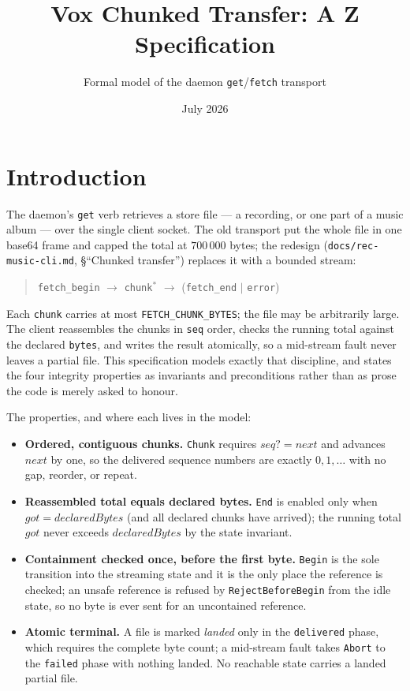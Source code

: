 \documentclass[a4paper,10pt,fleqn]{article}
\begin{document}
\title{Vox Chunked Transfer: A Z Specification}
\author{Formal model of the daemon \texttt{get}/\texttt{fetch} transport}
\date{July 2026}
\maketitle

\section{Introduction}

The daemon's \texttt{get} verb retrieves a store file --- a recording, or one
part of a music album --- over the single client socket. The old transport put
the whole file in one base64 frame and capped the total at
$700\,000$ bytes; the redesign (\texttt{docs/rec-music-cli.md},
\S``Chunked transfer'') replaces it with a bounded stream:

\begin{quote}
\texttt{fetch\_begin} $\rightarrow$ \texttt{chunk}$^{*}$ $\rightarrow$
(\texttt{fetch\_end} $\mid$ \texttt{error})
\end{quote}

Each \texttt{chunk} carries at most \texttt{FETCH\_CHUNK\_BYTES}; the file may be
arbitrarily large. The client reassembles the chunks in \texttt{seq} order,
checks the running total against the declared \texttt{bytes}, and writes the
result atomically, so a mid-stream fault never leaves a partial file. This
specification models exactly that discipline, and states the four integrity
properties as invariants and preconditions rather than as prose the code is
merely asked to honour.

The properties, and where each lives in the model:

\begin{itemize}
  \item \textbf{Ordered, contiguous chunks.} \texttt{Chunk} requires
    $seq? = next$ and advances $next$ by one, so the delivered sequence numbers
    are exactly $0, 1, \dots$ with no gap, reorder, or repeat.
  \item \textbf{Reassembled total equals declared bytes.} \texttt{End} is
    enabled only when $got = declaredBytes$ (and all declared chunks have
    arrived); the running total $got$ never exceeds $declaredBytes$ by the state
    invariant.
  \item \textbf{Containment checked once, before the first byte.}
    \texttt{Begin} is the sole transition into the streaming state and it is the
    only place the reference is checked; an unsafe reference is refused by
    \texttt{RejectBeforeBegin} from the idle state, so no byte is ever sent for
    an uncontained reference.
  \item \textbf{Atomic terminal.} A file is marked \emph{landed} only in the
    \texttt{delivered} phase, which requires the complete byte count; a
    mid-stream fault takes \texttt{Abort} to the \texttt{failed} phase with
    nothing landed. No reachable state carries a landed partial file.
\end{itemize}
\end{document}
